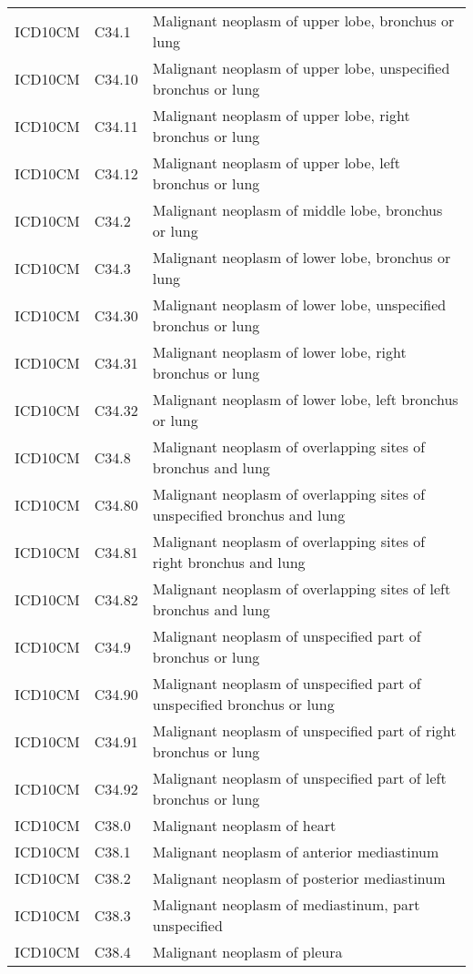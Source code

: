 \begin{longtable}{p{}p{}p{}}
  ICD10CM & C34.1 & Malignant neoplasm of upper lobe, bronchus or lung \\ 
  ICD10CM & C34.10 & Malignant neoplasm of upper lobe, unspecified bronchus or lung \\ 
  ICD10CM & C34.11 & Malignant neoplasm of upper lobe, right bronchus or lung \\ 
  ICD10CM & C34.12 & Malignant neoplasm of upper lobe, left bronchus or lung \\ 
  ICD10CM & C34.2 & Malignant neoplasm of middle lobe, bronchus or lung \\ 
  ICD10CM & C34.3 & Malignant neoplasm of lower lobe, bronchus or lung \\ 
  ICD10CM & C34.30 & Malignant neoplasm of lower lobe, unspecified bronchus or lung \\ 
  ICD10CM & C34.31 & Malignant neoplasm of lower lobe, right bronchus or lung \\ 
  ICD10CM & C34.32 & Malignant neoplasm of lower lobe, left bronchus or lung \\ 
  ICD10CM & C34.8 & Malignant neoplasm of overlapping sites of bronchus and lung \\ 
  ICD10CM & C34.80 & Malignant neoplasm of overlapping sites of unspecified bronchus and lung \\ 
  ICD10CM & C34.81 & Malignant neoplasm of overlapping sites of right bronchus and lung \\ 
  ICD10CM & C34.82 & Malignant neoplasm of overlapping sites of left bronchus and lung \\ 
  ICD10CM & C34.9 & Malignant neoplasm of unspecified part of bronchus or lung \\ 
  ICD10CM & C34.90 & Malignant neoplasm of unspecified part of unspecified bronchus or lung \\ 
  ICD10CM & C34.91 & Malignant neoplasm of unspecified part of right bronchus or lung \\ 
  ICD10CM & C34.92 & Malignant neoplasm of unspecified part of left bronchus or lung \\ 
  ICD10CM & C38.0 & Malignant neoplasm of heart \\ 
  ICD10CM & C38.1 & Malignant neoplasm of anterior mediastinum \\ 
  ICD10CM & C38.2 & Malignant neoplasm of posterior mediastinum \\ 
  ICD10CM & C38.3 & Malignant neoplasm of mediastinum, part unspecified \\ 
  ICD10CM & C38.4 & Malignant neoplasm of pleura \\ 

\end{longtable}
